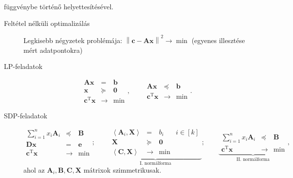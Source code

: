 \documentclass[DIV=15,appendixprefix]{scrreprt}
\theoremstyle{definition}
\theoremstyle{remark}
\DeclareMathOperator{\T}{T}
\begin{document}
függvénybe történő helyettesítésével.
\begin{description}
	\item[Feltétel nélküli optimalizálás] Legkisebb négyzetek problémája: $ \left\| \mathbf{ c } -
		\mathbf{ A } \mathbf{ x } \right\|^{ 2 } \rightarrow \min $ (egyenes illesztése mért
		adatpontokra)
	\item[LP-feladatok] \begin{equation}\tag{LP}
			\begin{array}{rcl}
				\mathbf{ A } \mathbf{ x }			&	=			&	\mathbf{ b }\\
				\mathbf{ x }						&	\succeq		&	\mathbf{ 0 }\\
				\hline
				\mathbf{ c }^{ \T } \mathbf{ x }	&	\rightarrow	&	\min
			\end{array}, \qquad \begin{array}{rcl}
				\mathbf{ A } \mathbf{ x }			&	\preceq		&	\mathbf{ b }\\
				\hline
				\mathbf{ c }^{ \T } \mathbf{ x }	&	\rightarrow	&	\min
			\end{array}.
		\end{equation}
	\item[SDP-feladatok] \begin{equation}\tag{SDP}
			\begin{array}{rcl}
				\sum_{ i = 1 }^{ n } x_{ i } \mathbf{ A }_{ i }		&	\preceq	&	\mathbf{ B }\\
				\mathbf{ D } \mathbf{ x }							&	=	&	\mathbf{ e }\\
				\hline
				\mathbf{ c }^{ \T } \mathbf{ x }	&	\rightarrow	&	\min
			\end{array}; \qquad \underbrace{\begin{array}{rcll}
				\left\langle \mathbf{ A }_{ i },{} \mathbf{ X } \right\rangle	&	=	&
					b_{ i }			&	i \in \left[ k \right]\\
				\mathbf{ X }													&	\succeq	&
					\mathbf{ 0 }	&\\
				\hline
				\left\langle \mathbf{ C },{} \mathbf{ X } \right\rangle			&	\rightarrow	&
					\min			&
			\end{array}}_{\text{I. normálforma}}; \qquad \underbrace{\begin{array}{rcl}
				\sum_{ i = 1 }^{ n } x_{ i } \mathbf{ A }_{ i }		&	\preceq	&	\mathbf{ B }\\
				\hline
				\mathbf{ c }^{ \T } \mathbf{ x }	&	\rightarrow	&	\min
			\end{array}}_{\text{II. normálforma}},
		\end{equation}
		ahol az $ \mathbf{ A }_{ i },{} \mathbf{ B },{} \mathbf{ C },{} \mathbf{ X } $ mátrixok
		szimmetrikusak.
\end{description}
\end{document}
